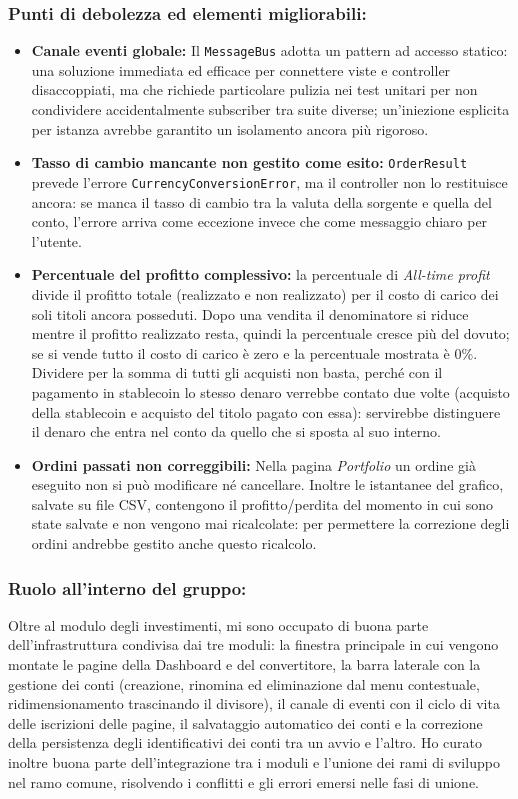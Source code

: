 \documentclass[11pt,a4paper,openright]{report}
\begin{document}
\subsubsection*{Punti di debolezza ed elementi migliorabili:}
\begin{itemize}[noitemsep,topsep=2pt]
    \item \textbf{Canale eventi globale:} Il \texttt{MessageBus} adotta un pattern ad accesso statico: una soluzione immediata ed efficace per connettere viste e controller disaccoppiati, ma che richiede particolare pulizia nei test unitari per non condividere accidentalmente subscriber tra suite diverse; un'iniezione esplicita per istanza avrebbe garantito un isolamento ancora più rigoroso.
    \item \textbf{Tasso di cambio mancante non gestito come esito:} \texttt{OrderResult} prevede l'errore \texttt{CurrencyConversionError}, ma il controller non lo restituisce ancora: se manca il tasso di cambio tra la valuta della sorgente e quella del conto, l'errore arriva come eccezione invece che come messaggio chiaro per l'utente.
    \item \textbf{Percentuale del profitto complessivo:} la percentuale di \emph{All-time profit} divide il profitto totale (realizzato e non realizzato) per il costo di carico dei soli titoli ancora posseduti. Dopo una vendita il denominatore si riduce mentre il profitto realizzato resta, quindi la percentuale cresce più del dovuto; se si vende tutto il costo di carico è zero e la percentuale mostrata è 0\%. Dividere per la somma di tutti gli acquisti non basta, perché con il pagamento in stablecoin lo stesso denaro verrebbe contato due volte (acquisto della stablecoin e acquisto del titolo pagato con essa): servirebbe distinguere il denaro che entra nel conto da quello che si sposta al suo interno.
    \item \textbf{Ordini passati non correggibili:} Nella pagina \emph{Portfolio} un ordine già eseguito non si può modificare né cancellare. Inoltre le istantanee del grafico, salvate su file CSV, contengono il profitto/perdita del momento in cui sono state salvate e non vengono mai ricalcolate: per permettere la correzione degli ordini andrebbe gestito anche questo ricalcolo.
\end{itemize}

\subsubsection*{Ruolo all'interno del gruppo:}
Oltre al modulo degli investimenti, mi sono occupato di buona parte dell'infrastruttura condivisa dai tre moduli: la finestra principale in cui vengono montate le pagine della Dashboard e del convertitore, la barra laterale con la gestione dei conti (creazione, rinomina ed eliminazione dal menu contestuale, ridimensionamento trascinando il divisore), il canale di eventi con il ciclo di vita delle iscrizioni delle pagine, il salvataggio automatico dei conti e la correzione della persistenza degli identificativi dei conti tra un avvio e l'altro. Ho curato inoltre buona parte dell'integrazione tra i moduli e l'unione dei rami di sviluppo nel ramo comune, risolvendo i conflitti e gli errori emersi nelle fasi di unione.
\end{document}
